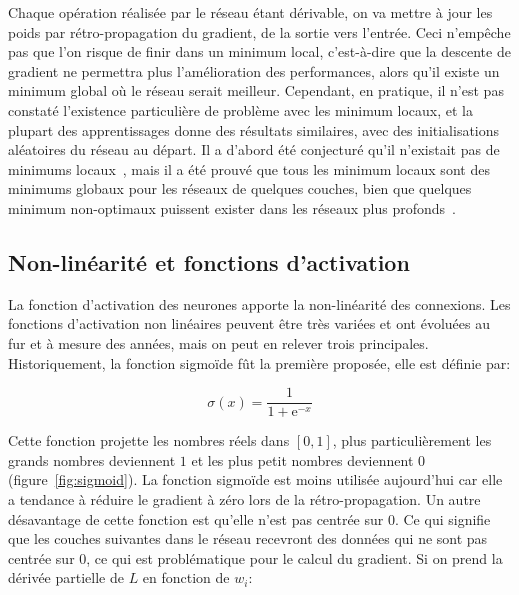 

Chaque opération réalisée par le réseau étant dérivable, on va mettre à jour les poids par rétro-propagation du gradient, de la sortie vers l'entrée.
Ceci n'empêche pas que l'on risque de finir dans un minimum local, c'est-à-dire que la descente de gradient ne permettra plus l'amélioration des performances, alors qu'il existe un minimum global où le réseau serait meilleur.
Cependant, en pratique, il n'est pas constaté l'existence particulière de problème avec les minimum locaux, et la plupart des apprentissages donne des résultats similaires, avec des initialisations aléatoires du réseau au départ.
Il a d'abord été conjecturé qu'il n'existait pas de minimums locaux~\cite{lecun1989backpropagation}, mais il a été prouvé que tous les minimum locaux sont des minimums globaux pour les réseaux de quelques couches, bien que quelques minimum non-optimaux puissent exister dans les réseaux plus profonds~\cite{kawaguchi2016deep}.







\subsection{Non-linéarité et fonctions d'activation}

La fonction d'activation des neurones apporte la non-linéarité des connexions.
Les fonctions d'activation non linéaires peuvent être très variées et ont évoluées au fur et à mesure des années, mais on peut en relever trois principales.
Historiquement, la fonction sigmoïde fût la première proposée, elle est définie par:

\begin{equation}
	\sigma(x)= \frac{1}{1+\text{e}^{-x}}
\label{eq:sigmoid}
\end{equation}

Cette fonction projette les nombres réels dans $ \left [0,1 \right ]$, plus particulièrement les grands nombres deviennent $1$ et les plus petit nombres deviennent $0$ (figure~\ref{fig:sigmoid}).
La fonction sigmoïde est moins utilisée aujourd'hui car elle a tendance à réduire le gradient à zéro lors de la rétro-propagation.
Un autre désavantage de cette fonction est qu'elle n'est pas centrée sur $0$. 
Ce qui signifie que les couches suivantes dans le réseau recevront des données qui ne sont pas centrée sur $0$, ce qui est problématique pour le calcul du gradient.
Si on prend la dérivée partielle de $L$ en fonction de $w_i$:

